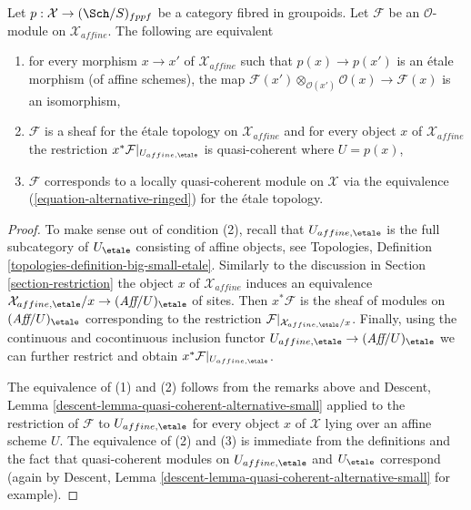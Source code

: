\begin{lemma}
\label{lemma-locally-quasi-coherent-alternative}
Let $p : \mathcal{X} \to (\Sch/S)_{fppf}$ be a category fibred in groupoids.
Let $\mathcal{F}$ be an $\mathcal{O}$-module on $\mathcal{X}_{affine}$.
The following are equivalent
\begin{enumerate}
\item for every morphism $x \to x'$ of $\mathcal{X}_{affine}$ such that
$p(x) \to p(x')$ is an \'etale morphism (of affine schemes), the map
$\mathcal{F}(x') \otimes_{\mathcal{O}(x')} \mathcal{O}(x) \to \mathcal{F}(x)$
is an isomorphism,
\item $\mathcal{F}$ is a sheaf for the \'etale topology on
$\mathcal{X}_{affine}$ and for every object $x$ of $\mathcal{X}_{affine}$
the restriction $x^*\mathcal{F}|_{U_{affine, \etale}}$ is quasi-coherent
where $U = p(x)$,
\item $\mathcal{F}$ corresponds to a locally quasi-coherent module
on $\mathcal{X}$ via the equivalence (\ref{equation-alternative-ringed})
for the \'etale topology.
\end{enumerate}
\end{lemma}

\begin{proof}
To make sense out of condition (2), recall that $U_{affine, \etale}$
is the full subcategory of $U_\etale$ consisting of affine objects, see
Topologies, Definition \ref{topologies-definition-big-small-etale}.
Similarly to the discussion in Section \ref{section-restriction}
the object $x$ of $\mathcal{X}_{affine}$ induces an equivalence
$\mathcal{X}_{affine, \etale}/x \to (\textit{Aff}/U)_\etale$ of sites.
Then $x^*\mathcal{F}$ is the sheaf of modules on $(\textit{Aff}/U)_\etale$
corresponding to the restriction
$\mathcal{F}|_{\mathcal{X}_{affine, \etale}/x}$.
Finally, using the continuous and cocontinuous inclusion functor
$U_{affine, \etale} \to (\textit{Aff}/U)_\etale$ we can further
restrict and obtain $x^*\mathcal{F}|_{U_{affine, \etale}}$.

\medskip\noindent
The equivalence of (1) and (2) follows from the remarks above and
Descent, Lemma \ref{descent-lemma-quasi-coherent-alternative-small}
applied to the restriction of $\mathcal{F}$ to $U_{affine, \etale}$
for every object $x$ of $\mathcal{X}$ lying over an affine scheme $U$.
The equivalence of (2) and (3) is immediate from the definitions
and the fact that quasi-coherent modules on $U_{affine, \etale}$
and $U_\etale$ correspond (again by
Descent, Lemma \ref{descent-lemma-quasi-coherent-alternative-small}
for example).
\end{proof}













